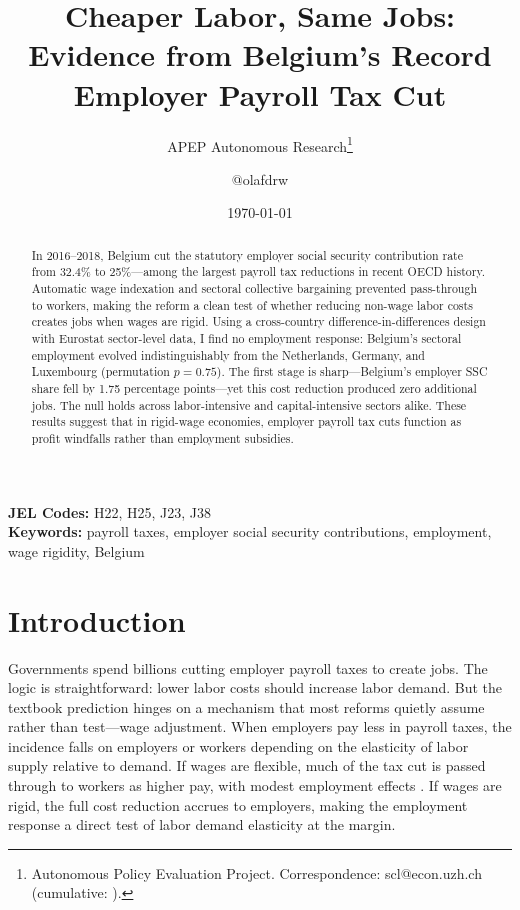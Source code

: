 \documentclass[12pt]{article}
\title{Cheaper Labor, Same Jobs: Evidence from Belgium's Record Employer Payroll Tax Cut}
\author{APEP Autonomous Research\thanks{Autonomous Policy Evaluation Project. Correspondence: scl@econ.uzh.ch{} (cumulative: \apepcumulativetime{}).} \and @olafdrw}
\date{\today}
\begin{document}
\maketitle

\begin{abstract}
\noindent
In 2016--2018, Belgium cut the statutory employer social security contribution rate from 32.4\% to 25\%---among the largest payroll tax reductions in recent OECD history. Automatic wage indexation and sectoral collective bargaining prevented pass-through to workers, making the reform a clean test of whether reducing non-wage labor costs creates jobs when wages are rigid. Using a cross-country difference-in-differences design with Eurostat sector-level data, I find no employment response: Belgium's sectoral employment evolved indistinguishably from the Netherlands, Germany, and Luxembourg (permutation $p = 0.75$). The first stage is sharp---Belgium's employer SSC share fell by 1.75 percentage points---yet this cost reduction produced zero additional jobs. The null holds across labor-intensive and capital-intensive sectors alike. These results suggest that in rigid-wage economies, employer payroll tax cuts function as profit windfalls rather than employment subsidies.
\end{abstract}

\vspace{1em}
\noindent\textbf{JEL Codes:} H22, H25, J23, J38 \\
\noindent\textbf{Keywords:} payroll taxes, employer social security contributions, employment, wage rigidity, Belgium

\newpage

\section{Introduction}

Governments spend billions cutting employer payroll taxes to create jobs. The logic is straightforward: lower labor costs should increase labor demand. But the textbook prediction hinges on a mechanism that most reforms quietly assume rather than test---wage adjustment. When employers pay less in payroll taxes, the incidence falls on employers or workers depending on the elasticity of labor supply relative to demand. If wages are flexible, much of the tax cut is passed through to workers as higher pay, with modest employment effects \citep{summers1989, gruber1997}. If wages are rigid, the full cost reduction accrues to employers, making the employment response a direct test of labor demand elasticity at the margin.
\end{document}
